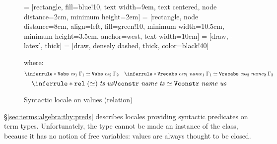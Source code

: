 \begin{figure}[t]
   = [rectangle, fill=blue!10, text width=9em, text centered, node distance=2cm, minimum height=2em]
   = [rectangle, node distance=8cm, align=left, fill=green!10, minimum width=10.5cm, minimum height=3.5em, anchor=west, text width=10cm]
   = [draw, -latex', thick]
   = [draw, densely dashed, thick, color=black!40]
  {
  \centering
  }

  where:
  \[
    \inferrule*{
    }{\holconst{Vabs}\;\cs_1\;\Gamma_1 \simeq \holconst{Vabs}\;\cs_2\;\Gamma_2} \quad
    \inferrule*{
    }{\holconst{Vrecabs}\;\css_1\;\mathit{name}_1\;\Gamma_1\simeq\holconst{Vrecabs}\;\css_2\;\mathit{name}_2\;\Gamma_2}
  \]
  \[
    \inferrule*{\holconst{rel}\;(\simeq)\;\mathit{ts}\;\mathit{us}
    }{\holconst{Vconstr}\;\mathit{name}\;\mathit{ts} \simeq \holconst{Vconstr}\;\mathit{name}\;\mathit{us}}
  \]

  \caption{Syntactic locale on values (relation)}
  \label{fig:terms:types:value:rel}
\end{figure}

§\ref{sec:terms:algebra:thy:preds} describes locales providing syntactic predicates on term types.
Unfortunately, the  type cannot be made an instance of the  class, because it has no notion of free variables: values are always thought to be closed.

